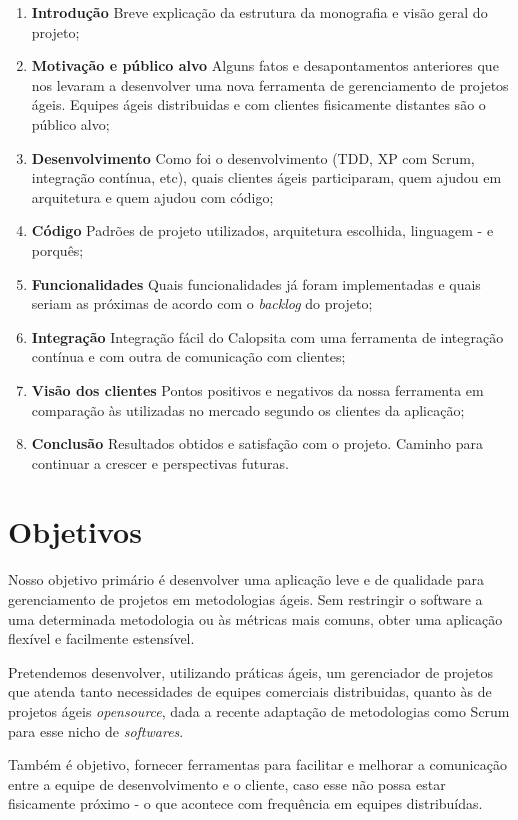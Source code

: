 \documentclass[titlepage]{article}
\begin{document}
\begin{enumerate}
	\item{\textbf{Introdução} Breve explicação da estrutura da monografia e visão geral do projeto;}
	\item{\textbf{Motivação e público alvo} Alguns fatos e desapontamentos anteriores que nos levaram a desenvolver uma nova ferramenta de gerenciamento de projetos ágeis. Equipes ágeis distribuidas e com clientes fisicamente distantes são o público alvo;}
	\item{\textbf{Desenvolvimento} Como foi o desenvolvimento (TDD, XP com Scrum, integração contínua, etc), quais clientes ágeis participaram, quem ajudou em arquitetura e quem ajudou com código;}
	\item{\textbf{Código} Padrões de projeto utilizados, arquitetura escolhida, linguagem - e porquês;}
	\item{\textbf{Funcionalidades} Quais funcionalidades já foram implementadas e quais seriam as próximas de acordo com o \textit{backlog} do projeto;}
	\item{\textbf{Integração} Integração fácil do Calopsita com uma ferramenta de integração contínua e com outra de comunicação com clientes;}
	\item{\textbf{Visão dos clientes} Pontos positivos e negativos da nossa ferramenta em comparação às utilizadas no mercado segundo os clientes da aplicação;}
	\item{\textbf{Conclusão} Resultados obtidos e satisfação com o projeto. Caminho para continuar a crescer e perspectivas futuras.}
\end{enumerate}

\section{Objetivos}
Nosso objetivo primário é desenvolver uma aplicação leve e de qualidade para gerenciamento de projetos em metodologias ágeis. Sem restringir o software a uma determinada metodologia ou às métricas mais comuns, obter uma aplicação flexível e facilmente estensível.

Pretendemos desenvolver, utilizando práticas ágeis, um gerenciador de projetos que atenda tanto necessidades de equipes comerciais distribuidas, quanto às de projetos ágeis \textit{opensource}, dada a recente adaptação de metodologias como Scrum para esse nicho de \textit{softwares}.

Também é objetivo, fornecer ferramentas para facilitar e melhorar a comunicação entre a equipe de desenvolvimento e o cliente, caso esse não possa estar fisicamente próximo - o que acontece com frequência em equipes distribuídas.
\end{document}
